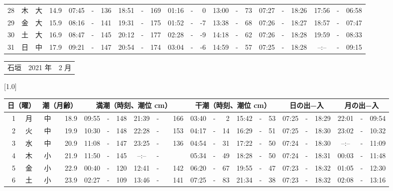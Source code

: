 \documentclass[12pt,a4j]{jsarticle}
\begin{document}
\begin{table}[htbp]
\begin{center}
{\begin{tabular}{|rc|cr|ccrccr|ccrccr|ccc|ccc|}
28 & 木 & 大 & 14.9 &  07:45 &-& 136 &  18:51 &-& 169 &  01:16 &-&   0 &  13:00 &-&  73 & 07:27 & -& 18:26 & 17:56 & -& 06:58 \\
29 & 金 & 大 & 15.9 &  08:16 &-& 141 &  19:31 &-& 175 &  01:52 &-&  -7 &  13:38 &-&  68 & 07:26 & -& 18:27 & 18:57 & -& 07:47 \\
30 & 土 & 大 & 16.9 &  08:47 &-& 145 &  20:12 &-& 177 &  02:28 &-&  -9 &  14:18 &-&  62 & 07:26 & -& 18:28 & 19:59 & -& 08:33 \\
31 & 日 & 中 & 17.9 &  09:21 &-& 147 &  20:54 &-& 174 &  03:04 &-&  -6 &  14:59 &-&  57 & 07:25 & -& 18:28 & --:-- & -& 09:15 \\
   \hline
   \end{tabular}}
   \end{center}
\end{table}
\newpage
 \begin{table}[htbp]
 \begin{center}
 \begin{tabular}{lcc}
 \LARGE{石垣}  & \large{2021 年} & \large{ 2 月} \\
 \end{tabular}
 \end{center}
 \begin{center}
    \scalebox{0.7}[1.0]{
    \begin{tabular}{|rc|cr|ccrccr|ccrccr|ccc|ccc|}
    \hline
    \multicolumn{2}{|c|}{日（曜）} & \multicolumn{2}{c|}{潮（月齢）} & \multicolumn{6}{c|}{満潮（時刻、潮位 cm）} & \multicolumn{6}{c|}{干潮（時刻、潮位 cm）} & \multicolumn{3}{c|}{日の出−入} &  \multicolumn{3}{c|}{月の出−入}\\
 \hline
 1 & 月 & 中 & 18.9 &  09:55 &-& 148 &  21:39 &-& 166 &  03:40 &-&   2 &  15:42 &-&  53 & 07:25 & -& 18:29 & 22:01 & -& 09:54 \\
 2 & 火 & 中 & 19.9 &  10:30 &-& 148 &  22:28 &-& 153 &  04:17 &-&  14 &  16:29 &-&  51 & 07:25 & -& 18:30 & 23:02 & -& 10:32 \\
 3 & 水 & 中 & 20.9 &  11:08 &-& 147 &  23:25 &-& 136 &  04:54 &-&  31 &  17:22 &-&  50 & 07:24 & -& 18:30 & --:-- & -& 11:09 \\
 4 & 木 & 小 & 21.9 &  11:50 &-& 145 &  --:-- &-&~~~~~ &  05:34 &-&  49 &  18:28 &-&  50 & 07:24 & -& 18:31 & 00:03 & -& 11:48 \\
 5 & 金 & 小 & 22.9 &  00:40 &-& 120 &  12:41 &-& 142 &  06:20 &-&  67 &  19:55 &-&  47 & 07:23 & -& 18:32 & 01:05 & -& 12:30 \\
 6 & 土 & 小 & 23.9 &  02:27 &-& 109 &  13:46 &-& 141 &  07:25 &-&  83 &  21:34 &-&  38 & 07:23 & -& 18:32 & 02:08 & -& 13:16 \\

\end{tabular}}
\end{center}
\end{table}
\end{document}
